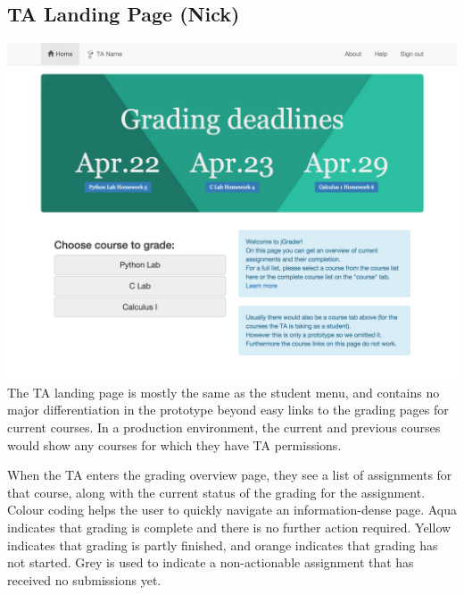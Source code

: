 \subsection{TA Landing Page (Nick)}
\includegraphics[width=\textwidth]{screenshots/TALandingPage.png}
The TA landing page is mostly the same as the student menu, and contains no major differentiation in the prototype beyond easy links to the grading pages for current courses. In a production environment, the current and previous courses would show any courses for which they have TA permissions. 

When the TA enters the grading overview page, they see a list of assignments for that course, along with the current status of the grading for the assignment. Colour coding helps the user to quickly navigate an information-dense page. Aqua indicates that grading is complete and there is no further action required. Yellow indicates that grading is partly finished, and orange indicates that grading has not started. Grey is used to indicate a non-actionable assignment that has received no submissions yet.